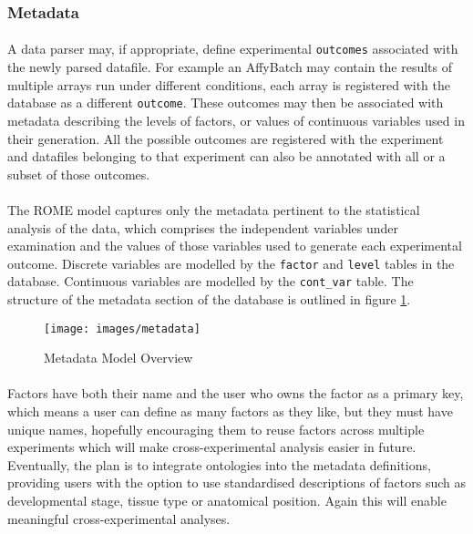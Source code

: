 \subsubsection{Metadata}
\label{sec:model_metadata}

\paragraph{}
A data parser may, if appropriate, define experimental \texttt{outcomes} associated with the newly parsed datafile. For example an AffyBatch may contain the results of multiple arrays run under different conditions, each array is registered with the database as a different \texttt{outcome}. These outcomes may then be associated with metadata describing the levels of factors, or values of continuous variables used in their generation. All the possible outcomes are registered with the experiment and datafiles belonging to that experiment can also be annotated with all or a subset of those outcomes. 


\paragraph{}
The ROME model captures only the metadata pertinent to the statistical analysis of the data, which comprises the independent variables under examination and the values of those variables used to generate each experimental outcome. Discrete variables are modelled by the \texttt{factor} and \texttt{level} tables in the database. Continuous variables are modelled by the \texttt{cont\_var} table. The structure of the metadata section of the database is outlined in figure \ref{fig:metadata_mod}. 

\begin{figure}
\centering
\caption{Metadata Model Overview}\label{fig:metadata_mod}
\texttt{[image: images/metadata]}
\end{figure}

\paragraph{}
Factors have both their name and the user who owns the factor as a primary key, which means a user can define as many factors as they like, but they must have unique names, hopefully encouraging them to reuse factors across multiple experiments which will make cross-experimental analysis easier in future. Eventually, the plan is to integrate ontologies into the metadata definitions, providing users with the option to use standardised descriptions of factors such as developmental stage, tissue type or anatomical position. Again this will enable meaningful cross-experimental analyses.
